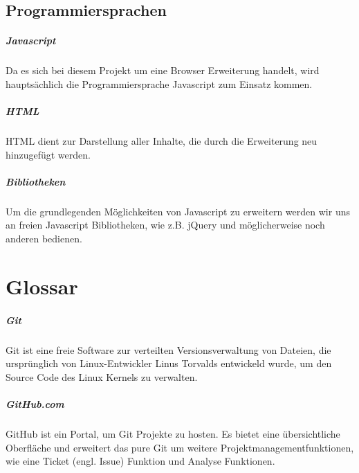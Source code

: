 \documentclass[11pt]{scrreprt}
\begin{document}
\section{Programmiersprachen}
\paragraph{Javascript}
Da es sich bei diesem Projekt um eine Browser Erweiterung handelt, wird hauptsächlich die Programmiersprache Javascript zum Einsatz kommen.
\paragraph{HTML}
HTML dient zur Darstellung aller Inhalte, die durch die Erweiterung neu hinzugefügt werden.
\paragraph{Bibliotheken}
Um die grundlegenden Möglichkeiten von Javascript zu erweitern werden wir uns an freien Javascript Bibliotheken, wie z.B. jQuery und möglicherweise noch anderen bedienen.

\chapter{Glossar}
\paragraph{Git} Git ist eine freie Software zur verteilten Versionsverwaltung von Dateien, die ursprünglich von Linux-Entwickler Linus Torvalds entwickeld wurde, um den Source Code des Linux Kernels zu verwalten.

\paragraph{GitHub.com} GitHub ist ein Portal, um Git Projekte zu hosten. Es bietet eine übersichtliche Oberfläche und erweitert das pure Git um weitere Projektmanagementfunktionen, wie eine Ticket (engl. Issue) Funktion und Analyse Funktionen.
\end{document}
